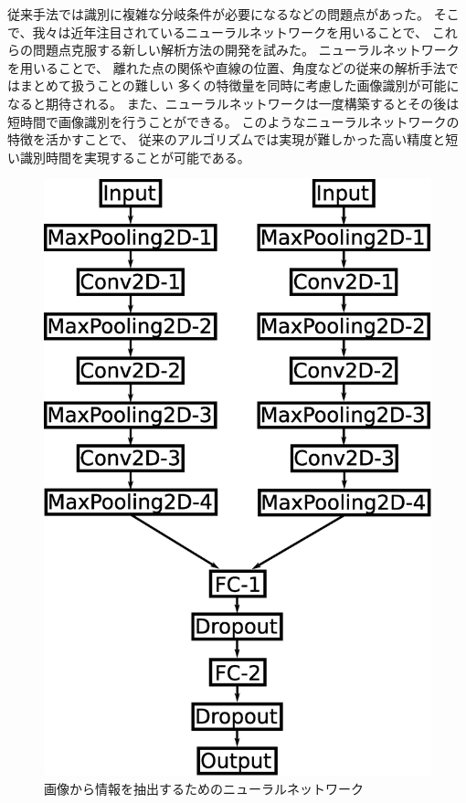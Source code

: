 \documentclass{jps-cp}
\begin{document}
従来手法では識別に複雑な分岐条件が必要になるなどの問題点があった。
そこで、我々は近年注目されているニューラルネットワークを用いることで、
これらの問題点克服する新しい解析方法の開発を試みた。
ニューラルネットワークを用いることで、
離れた点の関係や直線の位置、角度などの従来の解析手法ではまとめて扱うことの難しい
多くの特徴量を同時に考慮した画像識別が可能になると期待される。
また、ニューラルネットワークは一度構築するとその後は短時間で画像識別を行うことができる。
このようなニューラルネットワークの特徴を活かすことで、
従来のアルゴリズムでは実現が難しかった高い精度と短い識別時間を実現することが可能である。

\begin{figure}
  \centering
  \includegraphics[clip, width=15zw]{eps/point_detection.eps}
  \caption{画像から情報を抽出するためのニューラルネットワーク}
  \label{fig:extraction}
\end{figure}
\end{document}
